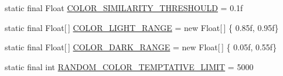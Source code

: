 \begin{DoxyCompactItemize}
static final Float \hyperlink{classit_1_1emarolab_1_1cagg_1_1debugging_1_1baseComponents_1_1LoggingTable_a4447bb7d0980bf6e59e005a9b099ddee}{C\-O\-L\-O\-R\-\_\-\-S\-I\-M\-I\-L\-A\-R\-I\-T\-Y\-\_\-\-T\-H\-R\-E\-S\-H\-O\-U\-L\-D} = 0.\-1f
\item 
static final Float\mbox{[}$\,$\mbox{]} \hyperlink{classit_1_1emarolab_1_1cagg_1_1debugging_1_1baseComponents_1_1LoggingTable_a647ac31a8b48fef5739c4daeec1b5389}{C\-O\-L\-O\-R\-\_\-\-L\-I\-G\-H\-T\-\_\-\-R\-A\-N\-G\-E} = new Float\mbox{[}$\,$\mbox{]} \{ 0.\-85f, 0.\-95f\}
\item 
static final Float\mbox{[}$\,$\mbox{]} \hyperlink{classit_1_1emarolab_1_1cagg_1_1debugging_1_1baseComponents_1_1LoggingTable_af3ea88c1d8d684e4ce1310d18c7a80e3}{C\-O\-L\-O\-R\-\_\-\-D\-A\-R\-K\-\_\-\-R\-A\-N\-G\-E} = new Float\mbox{[}$\,$\mbox{]} \{ 0.\-05f, 0.\-55f\}
\item 
static final int \hyperlink{classit_1_1emarolab_1_1cagg_1_1debugging_1_1baseComponents_1_1LoggingTable_af5e5eab532fca334d82a5b1da0c60acc}{R\-A\-N\-D\-O\-M\-\_\-\-C\-O\-L\-O\-R\-\_\-\-T\-E\-M\-P\-T\-A\-T\-I\-V\-E\-\_\-\-L\-I\-M\-I\-T} = 5000
\end{DoxyCompactItemize}
